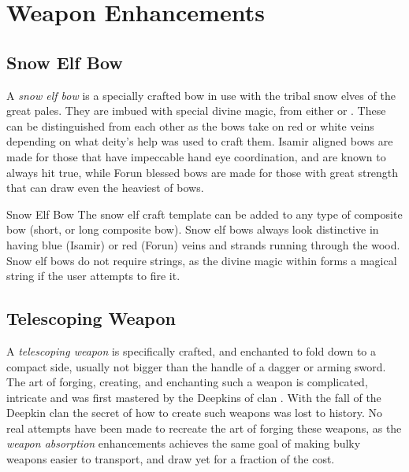 \section{Weapon Enhancements}

\subsection{Snow Elf Bow}
\label{sec:Snow Elf Bow}

A \emph{snow elf bow} is a specially crafted bow in use with the tribal snow
elves of the great pales. They are imbued with special divine magic, from
either  or . These can be distinguished
from each other as the bows take on red or white veins depending on what deity's
help was used to craft them. Isamir aligned bows are made for those that have
impeccable hand eye coordination, and are known to always hit true, while Forun
blessed bows are made for those with great strength that can draw even the
heaviest of bows.

\begin{35e}{Snow Elf Bow}
  The snow elf craft template can be added to any type of composite bow (short,
  or long composite bow). Snow elf bows always look distinctive in having blue
  (Isamir) or red (Forun) veins and strands running through the wood. Snow elf
  bows do not require strings, as the divine magic within forms a magical string
  if the user attempts to fire it.

\end{35e}

\subsection{Telescoping Weapon}
\label{sec:Telescoping Weapon}

A \emph{telescoping weapon} is specifically crafted, and enchanted to fold
down to a compact side, usually not bigger than the handle of a dagger or
arming sword. The art of forging, creating, and enchanting such a weapon is
complicated, intricate and was first mastered by the Deepkins of clan
. With the fall of the Deepkin clan the secret of how to
create such weapons was lost to history. No real attempts have been made to
recreate the art of forging these weapons, as the \emph{weapon absorption}
enhancements achieves the same goal of making bulky weapons easier to
transport, and draw yet for a fraction of the cost.

